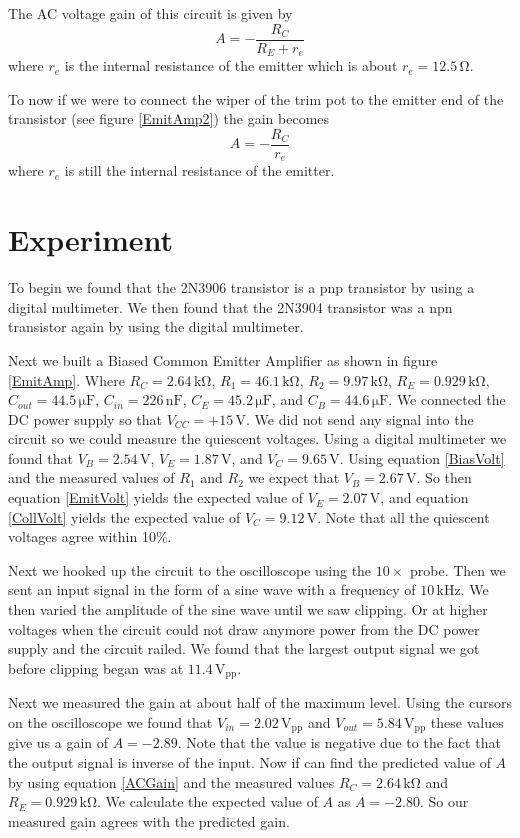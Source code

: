 \documentclass[11pt]{article}
\numberwithin{equation}{section}
\numberwithin{figure}{section}
\numberwithin{table}{section}
\newcommand{\unit}[1]{\ensuremath{\, \mathrm{#1}}}
\begin{document}
The AC voltage gain of this circuit is given by
\begin{equation}
A = -\frac{R_C}{R_E+r_e}
\label{ACGain}
\end{equation}
where $r_e$ is the internal resistance of the emitter which is about $r_e = 12.5\unit{\Omega}$.

To now if we were to connect the wiper of the trim pot to the emitter end of the transistor (see figure \ref{EmitAmp2}) the gain becomes
\begin{equation}
A = -\frac{R_C}{r_e}
\label{GainPot}
\end{equation}
where $r_e$ is still the internal resistance of the emitter.


\section{Experiment}
To begin we found that the 2N3906 transistor is a pnp transistor by using a digital multimeter. We then found that the 2N3904 transistor was a npn transistor again by using the digital multimeter. 

Next we built a Biased Common Emitter Amplifier as shown in figure \ref{EmitAmp}. Where $R_C = 2.64\unit{k\Omega}$, $R_1=46.1\unit{k\Omega}$, $R_2=9.97\unit{k\Omega}$, $R_E = 0.929\unit{k\Omega}$, $C_{out} = 44.5\unit{\mu F}$, $C_{in} = 226\unit{nF}$, $C_E=45.2\unit{\mu F}$, and $C_B = 44.6\unit{\mu F}$. We connected the DC power supply so that $V_{CC} = +15\unit{V}$. We did not send any signal into the circuit so we could measure the quiescent voltages. Using a digital multimeter we found that $V_B = 2.54\unit{V}$, $V_E=1.87\unit{V}$, and $V_C=9.65\unit{V}$. Using equation \ref{BiasVolt} and the measured values of $R_1$ and $R_2$ we expect that $V_B=2.67\unit{V}$. So then equation \ref{EmitVolt} yields the expected value of $V_E=2.07\unit{V}$, and equation \ref{CollVolt} yields the expected value of $V_C=9.12\unit{V}$. Note that all the quiescent voltages agree within 10\%.

Next we hooked up the circuit to the oscilloscope using the $10\times$ probe. Then we sent an input signal in the form of a sine wave with a frequency of $10\unit{kHz}$. We then varied the amplitude of the sine wave until we saw clipping. Or at higher voltages when the circuit could not draw anymore power from the DC power supply and the circuit railed. We found that the largest output signal we got before clipping began was at $11.4\unit{V_{pp}}$.

Next we measured the gain at about half of the maximum level. Using the cursors on the oscilloscope we found that $V_{in} = 2.02\unit{V_{pp}}$ and $V_{out} = 5.84\unit{V_{pp}}$ these values give us a gain of $A = -2.89$. Note that the value is negative due to the fact that the output signal is inverse of the input. Now if can find the predicted value of $A$ by using equation \ref{ACGain} and the measured values $R_C = 2.64\unit{k\Omega}$ and $R_E = 0.929\unit{k\Omega}$. We calculate the expected value of $A$ as $A = -2.80$. So our measured gain agrees with the predicted gain.
\end{document}
